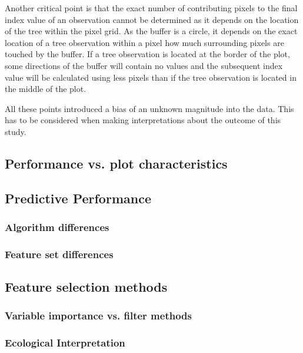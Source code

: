 \documentclass[letterpaper, journal]{IEEEtran}
\begin{document}
Another critical point is that the exact number of contributing pixels to the final index value of an observation cannot be determined as it depends on the location of the tree within the pixel grid.
As the buffer is a circle, it depends on the exact location of a tree observation within a pixel how much surrounding pixels are touched by the buffer.
If a tree observation is located at the border of the plot, some directions of the buffer will contain no values and the subsequent index value will be calculated using less pixels than if the tree observation is located in the middle of the plot.

All these points introduced a bias of an unknown magnitude into the data.
This has to be considered when making interpretations about the outcome of this study.

\subsection{Performance vs. plot characteristics}

\subsection{Predictive Performance}

\subsubsection{Algorithm differences}

\subsubsection{Feature set differences}

\subsection{Feature selection methods}

\subsubsection{Variable importance vs. filter methods}

\subsubsection{Ecological Interpretation}

\end{document}
